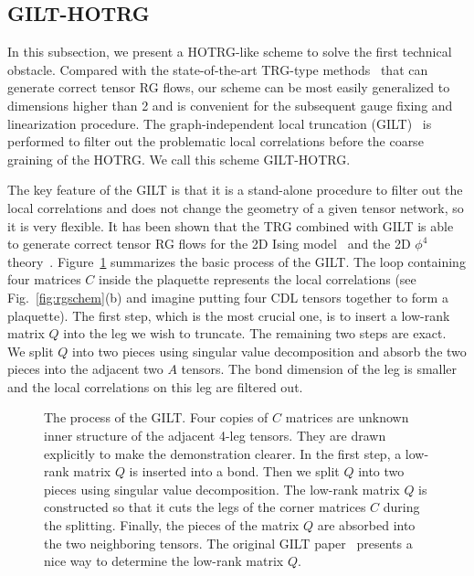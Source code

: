 \documentclass[aps,prr,reprint,superscriptaddress,floatfix]{revtex4-2}
\begin{document}
\subsection{GILT-HOTRG\label{sec:gilthotrg}}
In this subsection, we present a HOTRG-like scheme to solve the first technical obstacle.
Compared with the state-of-the-art TRG-type methods~\cite{GuWen2009,tnr,tnralgo,tnrplus,looptnr,harada2018,fet,tns,tensor-ring,gilts} that can generate correct tensor RG flows, our scheme can be most easily generalized to dimensions higher than 2 and is convenient for the subsequent gauge fixing and linearization procedure.
The graph-independent local truncation (GILT)~\cite{gilts} is performed to filter out the problematic local correlations before the coarse graining of the HOTRG\@.
We call this scheme GILT-HOTRG\@.
%

The key feature of the GILT is that it is a stand-alone procedure to filter out the local correlations and does not change the geometry of a given tensor network, so it is very flexible.
It has been shown that the TRG combined with GILT is able to generate correct tensor RG flows for the 2D Ising model~\cite{gilts} and the 2D $\phi^4$ theory~\cite{Delcamp2020}.
Figure~\ref{fig:gilt} summarizes the basic process of the GILT. 
The loop containing four matrices $C$ inside the plaquette represents the local correlations (see Fig.~\ref{fig:rgschem}(b) and imagine putting four CDL tensors together to form a plaquette). 
The first step, which is the most crucial one, is to insert a low-rank matrix $Q$ into the leg we wish to truncate. 
The remaining two steps are exact. We split $Q$ into two pieces using singular value decomposition and absorb the two pieces into the adjacent two $A$ tensors. 
The bond dimension of the leg is smaller and the local correlations on this leg are filtered out. 
%
%
\begin{figure}[t]
    \caption{\label{fig:gilt}
        The process of the GILT. 
        Four copies of $C$ matrices are unknown inner structure of the adjacent 4-leg tensors.
        They are drawn explicitly to make the demonstration clearer.
        In the first step, a low-rank matrix $Q$ is inserted into a bond. Then we split $Q$ into two pieces using singular value decomposition. 
        The low-rank matrix $Q$ is constructed so that it cuts the legs of the corner matrices $C$ during the splitting. 
        Finally, the pieces of the matrix $Q$ are absorbed into the two neighboring tensors. 
        The original GILT paper~\cite{gilts} presents a nice way to determine the
low-rank matrix $Q$.}
\end{figure}
%
\end{document}
